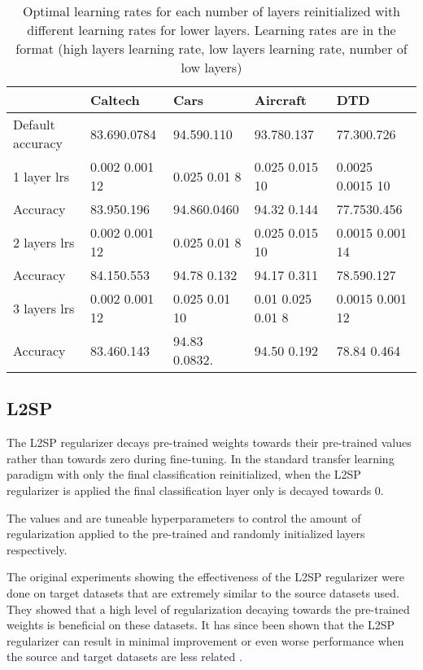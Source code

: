 \documentclass[]{article}
\begin{document}
\begin{table}[th]

\caption{Optimal learning rates for each number of layers reinitialized with
different learning rates for lower layers. Learning rates are in the format (high layers learning rate, low layers learning rate, number of low layers)
}
\label{low_lr}
\centering
\begin{tabular}{p{2.5cm}p{2.2cm}p{2.2cm}p{2.4cm}p{2.4cm}}
\hline 
 & Caltech & Cars & Aircraft & DTD\tabularnewline
\hline 
Default accuracy  & 83.690.0784 & 94.590.110 & 93.780.137 & 77.300.726\tabularnewline
1 layer lrs & 0.002 0.001 12  & 0.025 0.01 8  & 0.025 0.015 10  & 0.0025 0.0015 10 \tabularnewline
Accuracy & 83.950.196 & 94.860.0460 & 94.32 0.144 & 77.7530.456\tabularnewline
2 layers lrs & 0.002 0.001 12  & 0.025 0.01 8  & 0.025 0.015 10  & 0.0015 0.001 14 \tabularnewline
Accuracy & 84.150.553 & 94.78 0.132 & 94.17 0.311 & 78.590.127\tabularnewline
3 layers lrs & 0.002 0.001 12  & 0.025 0.01 10  & 0.01 0.025 0.01 8  & 0.0015 0.001 12 \tabularnewline
Accuracy & 83.460.143 & 94.83 0.0832. & 94.50 0.192 & 78.84 0.464\tabularnewline
\hline 
\end{tabular}
\end{table}


\subsection{L2SP}

The L2SP regularizer decays pre-trained weights towards their pre-trained
values rather than towards zero during fine-tuning. In the standard
transfer learning paradigm with only the final classification reinitialized,
when the L2SP regularizer is applied the final classification layer
only is decayed towards 0.

The values  and  are tuneable hyperparameters to control
the amount of regularization applied to the pre-trained and randomly
initialized layers respectively.

The original experiments showing the effectiveness of the L2SP regularizer
\cite{li2018explicit} were done on target datasets that are extremely
similar to the source datasets used. They showed that a high level of
regularization decaying towards the pre-trained weights is beneficial on these datasets.
It has since been shown that the L2SP regularizer can result in minimal
improvement or even worse performance when the source and target datasets
are less related \cite{li2020rethinking,wan2019towards}. 
\end{document}
